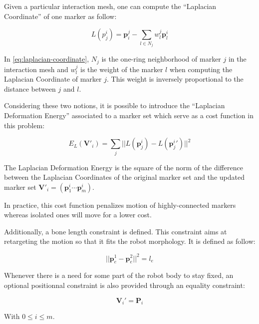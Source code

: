 \documentclass[letterpaper, 10 pt, conference]{ieeeconf}  %
\begin{document}
Given a particular interaction mesh, one can compute the ``Laplacian
Coordinate'' of one marker as follow:

\begin{equation}\label{eq:laplacian-coordinate}
L(p^i_j) = \mathbf{p}_i^j - \sum_{l \in N_j} w^j_l \mathbf{p}^i_l
\end{equation}

In \autoref{eq:laplacian-coordinate}, $N_j$ is the one-ring
neighborhood of marker $j$ in the interaction mesh and $w^j_l$ is the
weight of the marker $l$ when computing the Laplacian Coordinate of
marker $j$. This weight is inversely proportional to the distance
between $j$ and $l$.

Considering these two notions, it is possible to introduce the
``Laplacian Deformation Energy'' associated to a marker set which
serve as a cost function in this problem:

\begin{equation}
E_L(\mathbf{V'}_i) = \sum_j || L(\mathbf{p}^i_j) - L(\mathbf{p}^i_j{}') ||^2
\end{equation}

The Laplacian Deformation Energy is the square of the norm of the
difference between the Laplacian Coordinates of the original marker
set and the updated marker set $\mathbf{V}'_i = (\mathbf{p}^i_1 \cdots
\mathbf{p}^i_m)$.

In practice, this cost function penalizes motion of highly-connected
markers whereas isolated ones will move for a lower cost.



Additionally, a bone length constraint is defined. This constraint
aims at retargeting the motion so that it fits the robot
morphology. It is defined as follow:

\begin{equation}
|| \mathbf{p}^1_e - \mathbf{p}^2_e ||^2 = l_e
\end{equation}


Whenever there is a need for some part of the robot body to stay
fixed, an optional positionnal constraint is also provided through an
equality constraint:

\begin{equation}
  \mathbf{V}_i' = \mathbf{P}_i
\end{equation}

With $0 \leq i \leq m$.

\end{document}
